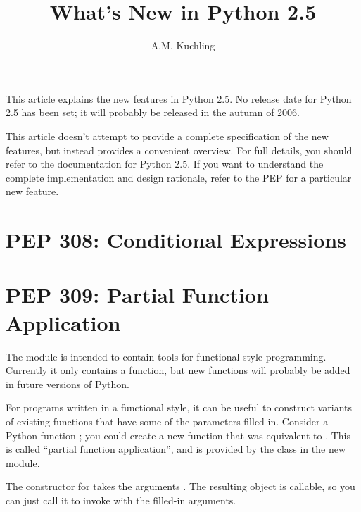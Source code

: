 \documentclass{howto}
\title{What's New in Python 2.5}
\author{A.M. Kuchling}
\begin{document}
\maketitle
\tableofcontents

This article explains the new features in Python 2.5.  No release date
for Python 2.5 has been set; it will probably be released in the
autumn of 2006.


This article doesn't attempt to provide a complete specification of
the new features, but instead provides a convenient overview.  For
full details, you should refer to the documentation for Python 2.5.
If you want to understand the complete implementation and design
rationale, refer to the PEP for a particular new feature.


\section{PEP 308: Conditional Expressions}



\section{PEP 309: Partial Function Application}

The  module is intended to contain tools for
functional-style programming.  Currently it only contains a
 function, but new functions will probably be added
in future versions of Python.

For programs written in a functional style, it can be useful to
construct variants of existing functions that have some of the
parameters filled in.  Consider a Python function ;
you could create a new function  that was equivalent to
.  This is called ``partial function application'',
and is provided by the  class in the new
 module.

The constructor for  takes the arguments
.  The resulting
object is callable, so you can just call it to invoke 
with the filled-in arguments.
\end{document}
